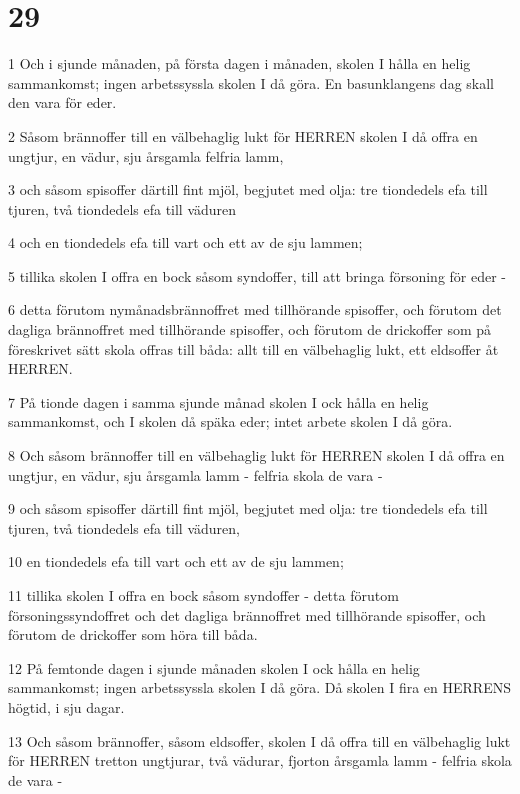\chapter{29}

\par 1 Och i sjunde månaden, på första dagen i månaden, skolen I hålla en helig sammankomst; ingen arbetssyssla skolen I då göra. En basunklangens dag skall den vara för eder.
\par 2 Såsom brännoffer till en välbehaglig lukt för HERREN skolen I då offra en ungtjur, en vädur, sju årsgamla felfria lamm,
\par 3 och såsom spisoffer därtill fint mjöl, begjutet med olja: tre tiondedels efa till tjuren, två tiondedels efa till väduren
\par 4 och en tiondedels efa till vart och ett av de sju lammen;
\par 5 tillika skolen I offra en bock såsom syndoffer, till att bringa försoning för eder -
\par 6 detta förutom nymånadsbrännoffret med tillhörande spisoffer, och förutom det dagliga brännoffret med tillhörande spisoffer, och förutom de drickoffer som på föreskrivet sätt skola offras till båda: allt till en välbehaglig lukt, ett eldsoffer åt HERREN.
\par 7 På tionde dagen i samma sjunde månad skolen I ock hålla en helig sammankomst, och I skolen då späka eder; intet arbete skolen I då göra.
\par 8 Och såsom brännoffer till en välbehaglig lukt för HERREN skolen I då offra en ungtjur, en vädur, sju årsgamla lamm - felfria skola de vara -
\par 9 och såsom spisoffer därtill fint mjöl, begjutet med olja: tre tiondedels efa till tjuren, två tiondedels efa till väduren,
\par 10 en tiondedels efa till vart och ett av de sju lammen;
\par 11 tillika skolen I offra en bock såsom syndoffer - detta förutom försoningssyndoffret och det dagliga brännoffret med tillhörande spisoffer, och förutom de drickoffer som höra till båda.
\par 12 På femtonde dagen i sjunde månaden skolen I ock hålla en helig sammankomst; ingen arbetssyssla skolen I då göra. Då skolen I fira en HERRENS högtid, i sju dagar.
\par 13 Och såsom brännoffer, såsom eldsoffer, skolen I då offra till en välbehaglig lukt för HERREN tretton ungtjurar, två vädurar, fjorton årsgamla lamm - felfria skola de vara -
